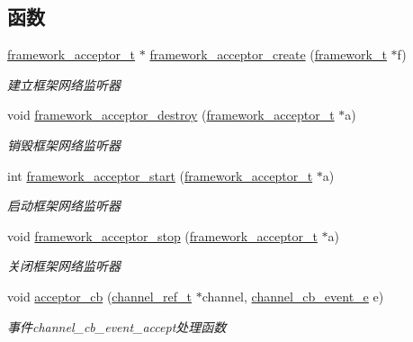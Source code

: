\subsection*{函数}
\begin{DoxyCompactItemize}
\item 
\hyperlink{a00047_ab0952db3c97c4760192720875e69d040_ab0952db3c97c4760192720875e69d040}{framework\+\_\+acceptor\+\_\+t} $\ast$ \hyperlink{a00050_a09f38093fc07ac67eb32a2d73d01ac00_a09f38093fc07ac67eb32a2d73d01ac00}{framework\+\_\+acceptor\+\_\+create} (\hyperlink{a00047_a6149d769f6f07ed14a40a271c95d8463_a6149d769f6f07ed14a40a271c95d8463}{framework\+\_\+t} $\ast$f)
\begin{DoxyCompactList}\small\item\em 建立框架网络监听器 \end{DoxyCompactList}\item 
void \hyperlink{a00050_a8547ef8ed59bf8fc10ce491cbc2e0e7d_a8547ef8ed59bf8fc10ce491cbc2e0e7d}{framework\+\_\+acceptor\+\_\+destroy} (\hyperlink{a00047_ab0952db3c97c4760192720875e69d040_ab0952db3c97c4760192720875e69d040}{framework\+\_\+acceptor\+\_\+t} $\ast$a)
\begin{DoxyCompactList}\small\item\em 销毁框架网络监听器 \end{DoxyCompactList}\item 
int \hyperlink{a00050_ae7af7233800a87f2719ba257be3fe738_ae7af7233800a87f2719ba257be3fe738}{framework\+\_\+acceptor\+\_\+start} (\hyperlink{a00047_ab0952db3c97c4760192720875e69d040_ab0952db3c97c4760192720875e69d040}{framework\+\_\+acceptor\+\_\+t} $\ast$a)
\begin{DoxyCompactList}\small\item\em 启动框架网络监听器 \end{DoxyCompactList}\item 
void \hyperlink{a00050_a53e38c44cdc8c84a57728a7f8e41dc27_a53e38c44cdc8c84a57728a7f8e41dc27}{framework\+\_\+acceptor\+\_\+stop} (\hyperlink{a00047_ab0952db3c97c4760192720875e69d040_ab0952db3c97c4760192720875e69d040}{framework\+\_\+acceptor\+\_\+t} $\ast$a)
\begin{DoxyCompactList}\small\item\em 关闭框架网络监听器 \end{DoxyCompactList}\item 
void \hyperlink{a00050_a4ef7d97742bc9410f486ebc4e0b75e82_a4ef7d97742bc9410f486ebc4e0b75e82}{acceptor\+\_\+cb} (\hyperlink{a00047_a151271c9d188ef28d4d24bb81dcc1263_a151271c9d188ef28d4d24bb81dcc1263}{channel\+\_\+ref\+\_\+t} $\ast$channel, \hyperlink{a00047_aaf2cba5d4035f3d56350b59342ebf65c_aaf2cba5d4035f3d56350b59342ebf65c}{channel\+\_\+cb\+\_\+event\+\_\+e} e)
\begin{DoxyCompactList}\small\item\em 事件channel\+\_\+cb\+\_\+event\+\_\+accept处理函数 \end{DoxyCompactList}\end{DoxyCompactItemize}


